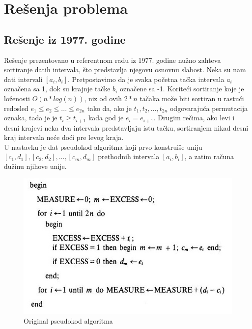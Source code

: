 \documentclass[a4paper]{article}
\begin{document}
\section{Rešenja problema}

\subsection{Rešenje iz 1977. godine}

Rešenje prezentovano u referentnom radu iz 1977. godine nužno zahteva sortiranje datih intervala, što predstavlja njegovu osnovnu slabost. Neka su nam dati intervali $[a_i, b_i]$. Pretpostavimo da je svaka početna tačka intervala $a_i$ označena sa 1, dok su krajnje tačke $b_i$ označene sa -1. Koriteći sortiranje koje je loženosti $O(n*log(n))$, niz od ovih $2*n$ tačaka može biti sortiran u rastući redosled $e_1 \leq e_2 \leq ... \leq e_{2n}$ tako da, ako je $t_1, t_2, ..., t_{2n}$ odgovarajuća permutacija oznaka, tada je  je $t_i \geq t_{i+1}$ kada god je $e_i = e_{i+1}$.
Drugim rečima, ako levi i desni krajevi neka dva intervala predstavljaju istu tačku, sortiranjem nikad desni kraj intervala neće doći pre levog kraja. \\

U nastavku je dat pseudokod algoritma koji prvo konstruiše uniju $[c_1, d_1], [c_2, d_2], ..., [c_m, d_m]$ prethodnih intervala $[a_i, b_i]$, a zatim računa dužinu njihove unije. 

\begin{figure}[h!]
\begin{center}
\includegraphics[scale=0.51]{klee_pseudo.JPG}
\end{center}
\caption{Original pseudokod algoritma}
\label{fig:pseudo}
\end{figure} 
\end{document}
